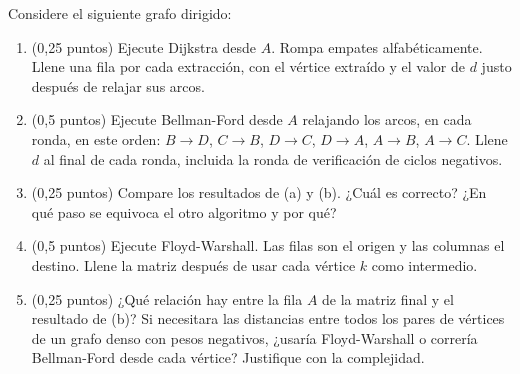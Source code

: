 
Considere el siguiente grafo dirigido:

\begin{center}
  
\end{center}

\begin{enumerate}[label=(\alph*)]
  \item (0,25 puntos) Ejecute Dijkstra desde $A$. Rompa empates alfabéticamente. Llene una fila por cada extracción, con el vértice extraído y el valor de $d$ justo después de relajar sus arcos.


  \pagebreak

  \item (0,5 puntos) Ejecute Bellman-Ford desde $A$ relajando los arcos, en cada ronda, en este orden: $B \to D$, $C \to B$, $D \to C$, $D \to A$, $A \to B$, $A \to C$. Llene $d$ al final de cada ronda, incluida la ronda de verificación de ciclos negativos.


  \item (0,25 puntos) Compare los resultados de (a) y (b). ¿Cuál es correcto? ¿En qué paso se equivoca el otro algoritmo y por qué?


  \pagebreak

  \item (0,5 puntos) Ejecute Floyd-Warshall. Las filas son el origen y las columnas el destino. Llene la matriz después de usar cada vértice $k$ como intermedio.

  \begin{center}
    \hspace{0.5cm}
    \hspace{0.5cm}

    \bigskip
    \hspace{1cm}
  \end{center}

  \item (0,25 puntos) ¿Qué relación hay entre la fila $A$ de la matriz final y el resultado de (b)? Si necesitara las distancias entre todos los pares de vértices de un grafo denso con pesos negativos, ¿usaría Floyd-Warshall o correría Bellman-Ford desde cada vértice? Justifique con la complejidad.

\end{enumerate}
